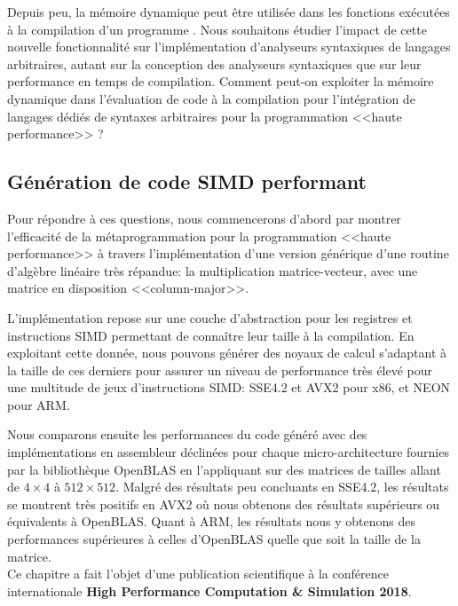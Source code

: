 \documentclass[main]{subfiles}
\begin{document}
Depuis peu, la m\'emoire dynamique peut \^etre utilis\'ee dans les fonctions
ex\'ecut\'ees \`a la compilation d'un programme \cpp. Nous souhaitons \'etudier
l'impact de cette nouvelle fonctionnalit\'e sur l'impl\'ementation d'analyseurs
syntaxiques de langages arbitraires, autant sur la conception des analyseurs
syntaxiques que sur leur performance en temps de compilation.
Comment peut-on exploiter la m\'emoire dynamique dans l'\'evaluation de code
\cpp \`a la compilation pour l'int\'egration de langages d\'edi\'es de syntaxes
arbitraires pour la programmation <<haute performance>> ?

\subsection*{G\'en\'eration de code SIMD performant}

Pour r\'epondre \`a ces questions, nous commencerons d'abord par montrer
l'efficacit\'e de la m\'etaprogrammation \cpp pour la programmation
<<haute performance>> \`a travers l'impl\'ementation d'une version
g\'en\'erique d'une routine d'alg\`ebre lin\'eaire tr\`es r\'epandue:
la multiplication matrice-vecteur, avec une matrice en disposition
<<column-major>>.

L'impl\'ementation repose sur une couche d'abstraction pour les registres et
instructions SIMD permettant de conna\^itre leur taille \`a la compilation.
En exploitant cette donn\'ee, nous pouvons g\'en\'erer des noyaux de calcul
s'adaptant \`a la taille de ces derniers pour assurer un niveau de performance
tr\`es \'elev\'e pour une multitude de jeux d'instructions SIMD: SSE4.2 et AVX2
pour x86, et NEON pour ARM.

Nous comparons ensuite les performances du code g\'en\'er\'e avec des
impl\'ementations en assembleur d\'eclin\'ees pour chaque micro-architecture
fournies par la biblioth\`eque OpenBLAS en l'appliquant sur des matrices de
tailles allant de $4 \times 4$ \`a $512 \times 512$.
Malgr\'e des r\'esultats peu concluants en SSE4.2, les r\'esultats se montrent
tr\`es positifs en AVX2 o\`u nous obtenons des r\'esultats sup\'erieurs ou
\'equivalents \`a OpenBLAS. Quant \`a ARM, les r\'esultats nous y obtenons
des performances sup\'erieures \`a celles d'OpenBLAS quelle que soit la taille
de la matrice.
\\

Ce chapitre a fait l'objet d'une publication scientifique \`a la conf\'erence
internationale \textbf{High Performance Computation \& Simulation 2018}.
\end{document}
